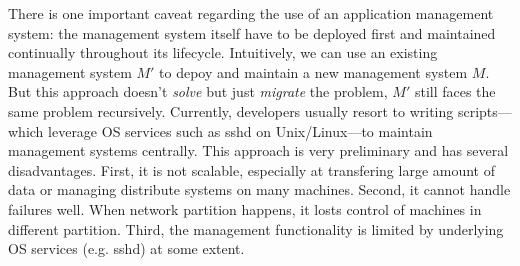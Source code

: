 There is one important caveat regarding the use of an
application management system: the management system itself
have to be deployed first and maintained continually
throughout its lifecycle. Intuitively, we can use an
existing management system $M'$ to depoy and maintain a new
management system $M$. But this approach doesn't
\emph{solve} but just \emph{migrate} the problem, $M'$ still
faces the same problem recursively.  Currently, developers
usually resort to writing scripts---which leverage OS
services such as sshd on Unix/Linux---to maintain management
systems centrally. This approach is very preliminary and has
several disadvantages.  First, it is not scalable,
especially at transfering large amount of data or managing
distribute systems on many machines. Second, it cannot
handle failures well. When network partition happens, it
losts control of machines in different partition. Third, the
management functionality is limited by underlying OS
services (e.g. sshd) at some extent.

% 
% 
% 
% 
% 
% 
% 
% 
% 
% 
% 

